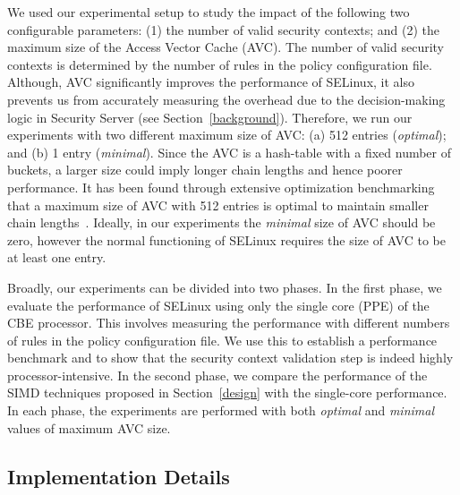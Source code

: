\documentclass[conference]{IEEEtran}
\begin{document}
We used our experimental setup to study the impact of the following two
configurable parameters: (1) the number of valid security contexts;
and (2) the maximum size of the Access Vector Cache (AVC).  The number of
valid security contexts is determined by the number of rules in the
policy configuration file. Although, AVC significantly improves the performance of SELinux, it also prevents us from accurately measuring the overhead due to the decision-making logic in Security Server (see Section~\ref{background}). Therefore, we run our experiments with two different maximum size of AVC: (a) 512 entries (\emph{optimal}); and (b) 1 entry (\emph{minimal}). Since the AVC is a hash-table with a fixed number of buckets, a larger size could imply longer chain lengths and hence poorer performance. It has been found through extensive optimization benchmarking that a maximum size of AVC with 512 entries is optimal to maintain smaller chain lengths~\cite{selinuxBook}. Ideally, in our experiments the \emph{minimal} size of AVC should be zero, however the normal functioning of SELinux requires the size of AVC to be at least one entry.

Broadly, our experiments can be divided into two phases.  In the first
phase, we evaluate the performance of SELinux using only the single
core (PPE) of the CBE processor.  This involves measuring the
performance with different numbers of rules in the policy
configuration file.  We use this to establish a performance benchmark
and to show that the security context validation step is indeed highly
processor-intensive.  In the second phase, we compare the performance
of the SIMD techniques proposed in Section~\ref{design} with the
single-core performance.  In each phase, the experiments are performed
with both \emph{optimal} and \emph{minimal} values of maximum AVC size.

\subsection{Implementation Details}\label{impl}
\end{document}
